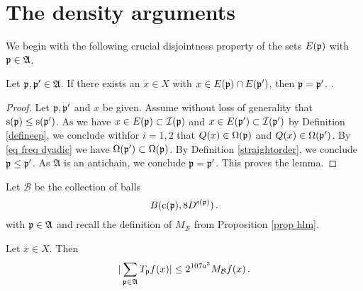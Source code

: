 \section{The density  arguments}\label{sec TT* T*T}

We begin with the following crucial disjointness property of the sets $E(\mathfrak p)$ with $\mathfrak p \in \mathfrak{A}$.
\begin{lemma}
\label{lem antichain -1}
Let $\mathfrak p,\mathfrak p'\in \mathfrak{A}$.
If there exists an $x\in X$ with $x\in  E(\mathfrak p)\cap E(\mathfrak p')$,
then $\mathfrak p= \mathfrak p'$.
.
\end{lemma}
\begin{proof}
Let $\mathfrak p,\mathfrak p'$ and $x$ be given.
Assume without loss of generality that $\mathrm{s}(\mathfrak p)\le \mathrm{s}(\mathfrak p')$.
As  we have $x\in E(\mathfrak p)\subset \mathcal{I}(\mathfrak p)$  and $x\in E(\mathfrak p')\subset \mathcal{I}(\mathfrak p')$ by Definition \eqref{defineep}, we conclude
withfor $i=1,2$ that
${Q}(x)\in\Omega(\mathfrak p)$ and ${Q}(x)\in\Omega(\mathfrak p')$. By \eqref{eq freq dyadic} we have $\Omega(\mathfrak p')\subset \Omega(\mathfrak p)$. By Definition
\eqref{straightorder}, we conclude $\mathfrak p\le \mathfrak p'$. As $\mathfrak{A}$ is an antichain, we conclude $\mathfrak p=\mathfrak p'$.
This proves the lemma.
\end{proof}



Let $\mathcal{B}$ be the collection of balls
\begin{equation}
    B(\mathrm{c}(\mathfrak p), 8D^{\mathrm{s}(\mathfrak p)})\, .
\end{equation}
with $\mathfrak p\in \mathfrak{A}$ and recall the definition of
$M_{\mathcal{B}}$ from Proposition \ref{prop hlm}.
\begin{lemma}\label{lem hlmbound}
Let $x\in X$.
Then
\begin{equation}\label{hlmbound}
  | \sum_{\mathfrak p \in \mathfrak{A}}T_{\mathfrak p} f(x)|\le 2^{107 a^3} M_{\mathcal{B}} f (x) \, .
\end{equation}
\end{lemma}



